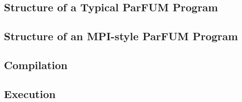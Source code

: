 
\subsection{Structure of a Typical ParFUM Program}

\subsection{Structure of an MPI-style ParFUM Program}

\subsection{Compilation}

\subsection{Execution}
